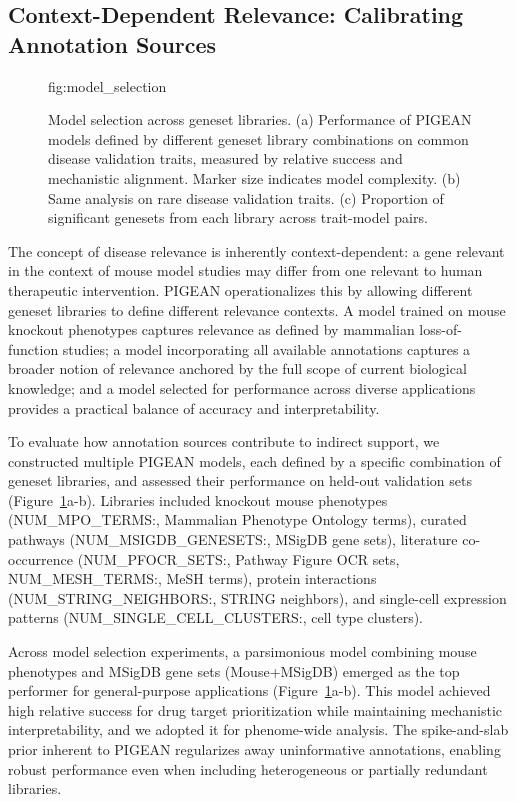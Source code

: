 \subsection{Context-Dependent Relevance: Calibrating Annotation Sources}

\begin{figure}[t!]
    \centering
    {{fig:model_selection}}
    \caption{Model selection across geneset libraries. (a) Performance of PIGEAN models defined by different geneset library combinations on common disease validation traits, measured by relative success and mechanistic alignment. Marker size indicates model complexity. (b) Same analysis on rare disease validation traits. (c) Proportion of significant genesets from each library across trait-model pairs.}
    \label{fig:model-selection}
\end{figure}

The concept of disease relevance is inherently context-dependent: a gene relevant in the context of mouse model studies may differ from one relevant to human therapeutic intervention. PIGEAN operationalizes this by allowing different geneset libraries to define different relevance contexts. A model trained on mouse knockout phenotypes captures relevance as defined by mammalian loss-of-function studies; a model incorporating all available annotations captures a broader notion of relevance anchored by the full scope of current biological knowledge; and a model selected for performance across diverse applications provides a practical balance of accuracy and interpretability.

To evaluate how annotation sources contribute to indirect support, we constructed multiple PIGEAN models, each defined by a specific combination of geneset libraries, and assessed their performance on held-out validation sets (Figure~\ref{fig:model-selection}a-b). Libraries included knockout mouse phenotypes ({{NUM_MPO_TERMS:,}} Mammalian Phenotype Ontology terms), curated pathways ({{NUM_MSIGDB_GENESETS:,}} MSigDB gene sets), literature co-occurrence ({{NUM_PFOCR_SETS:,}} Pathway Figure OCR sets, {{NUM_MESH_TERMS:,}} MeSH terms), protein interactions ({{NUM_STRING_NEIGHBORS:,}} STRING neighbors), and single-cell expression patterns ({{NUM_SINGLE_CELL_CLUSTERS:,}} cell type clusters).

Across model selection experiments, a parsimonious model combining mouse phenotypes and MSigDB gene sets (Mouse+MSigDB) emerged as the top performer for general-purpose applications (Figure~\ref{fig:model-selection}a-b). This model achieved high relative success for drug target prioritization while maintaining mechanistic interpretability, and we adopted it for phenome-wide analysis. The spike-and-slab prior inherent to PIGEAN regularizes away uninformative annotations, enabling robust performance even when including heterogeneous or partially redundant libraries.

